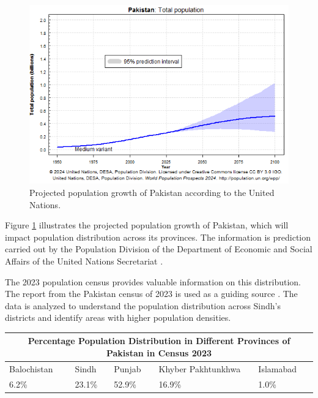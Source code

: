 \documentclass{article}
\begin{document}
\begin{figure}[H]
    \centering
    \includegraphics[width=\textwidth]{../Figures/Figure01.png}
    \caption{Projected population growth of Pakistan according to the United Nations.}
    \label{fig:fig1}
\end{figure}

\noindent Figure \ref{fig:fig1} illustrates the projected population growth of Pakistan, which will impact population distribution across its provinces. The information is prediction carried out by the Population Division of the Department of Economic and Social Affairs of the United Nations Secretariat \cite{bib01}.

\vspace{0.5cm}

\noindent The 2023 population census provides valuable information on this distribution. The report from the Pakistan census of 2023 is used as a guiding source \cite{bib02}. The data is analyzed to understand the population distribution across Sindh's districts and identify areas with higher population densities.

\begin{center}
    \begin{tabular}{ |p{3cm}|p{3cm}|p{3cm}|p{3cm}|p{3cm}|  }
        \hline
        \multicolumn{5}{|c|}{Percentage Population Distribution in Different Provinces of Pakistan in Census 2023} \\ 
        \hline
        Balochistan & Sindh & Punjab & Khyber Pakhtunkhwa & Islamabad \\ 
        \hline
        6.2\% & 23.1\% & 52.9\% & 16.9\% & 1.0\% \\ 
        \hline
    \end{tabular}
\end{center}
\end{document}
